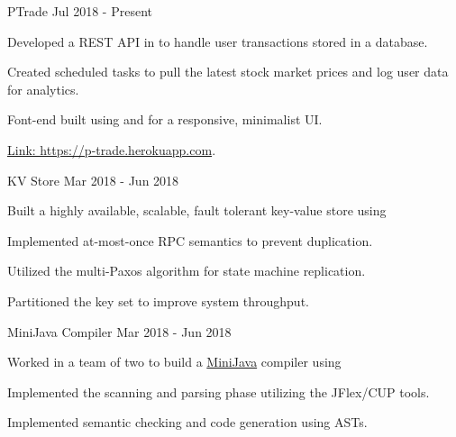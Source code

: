 \begin{cvskills}
    \cvproject
        {PTrade}
        {Jul 2018 - Present}
        {\begin{cvitems} %
            \item{Developed a REST API in  to handle user transactions stored in a  database.}
            \item{Created scheduled tasks to pull the latest stock market prices and log user data for analytics.}
            \item{Font-end built using  and  for a responsive, minimalist UI.}
            \item{\href{https://p-trade.herokuapp.com}{Link: \color{blue}https://p-trade.herokuapp.com}.}
        \end{cvitems}}
\end{cvskills}

\begin{cvskills}
    \cvproject
        {KV Store}
        {Mar 2018 - Jun 2018}
        {\begin{cvitems} %
            \item{Built a highly available, scalable, fault tolerant key-value store using }
            \item{Implemented at-most-once RPC semantics to prevent duplication.}
            \item{Utilized the multi-Paxos algorithm for state machine replication.}
            \item{Partitioned the key set to improve system throughput.}
        \end{cvitems}}
\end{cvskills}

\begin{cvskills}
    \cvproject
        {MiniJava Compiler}
        {Mar 2018 - Jun 2018}
        {\begin{cvitems} %
            \item{
                Worked in a team of two to build a \href{http://www.cambridge.org/resources/052182060X/}
                {\color{blue}MiniJava} compiler using 
            }
            \item{Implemented the scanning and parsing phase utilizing the JFlex/CUP tools.}
            \item{Implemented semantic checking and code generation using ASTs.}
        \end{cvitems}}
\end{cvskills}

